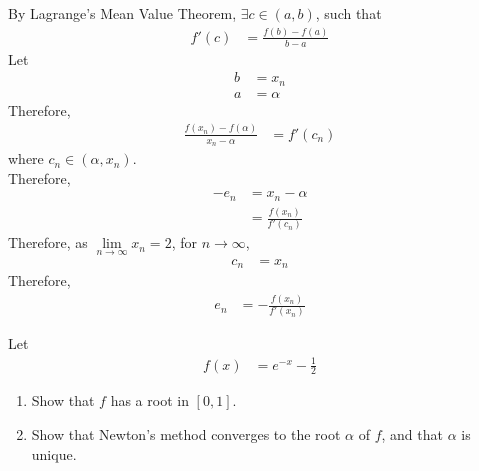 \documentclass[fleqn, a4paper, 12pt, twoside]{article}
\theoremstyle{definition}
\theoremstyle{theorem}
\begin{document}
\begin{solution}
	By Lagrange's Mean Value Theorem, $\exists c \in (a,b)$, such that
	\begin{align*}
		f'(c) & = \frac{f(b) - f(a)}{b - a}
	\end{align*}
	Let
	\begin{align*}
		b & = x_n \\
		a & = \alpha
	\end{align*}
	Therefore,
	\begin{align*}
		\frac{f(x_n) - f(\alpha)}{x_n - \alpha} & = f'(c_n)
	\end{align*}
	where $c_n \in (\alpha,x_n)$.\\
	Therefore,
	\begin{align*}
		-e_n & = x_n - \alpha \\
                     & = \frac{f(x_n)}{f'(c_n)}
	\end{align*}
	Therefore, as $\lim\limits_{n \to \infty} x_n = 2$, for $n \to \infty$,
	\begin{align*}
		c_n & = x_n
	\end{align*}
	Therefore,
	\begin{align*}
		e_n & = -\frac{f(x_n)}{f'(x_n)}
	\end{align*}
\end{solution}

\begin{question}
	Let 
	\begin{align*}
		f(x) & = e^{-x} - \frac{1}{2}
	\end{align*}
	\begin{enumerate}
		\item Show that $f$ has a root in $[0,1]$.
		\item Show that Newton's method converges to the root $\alpha$ of $f$, and that $\alpha$ is unique.
	\end{enumerate}
\end{question}
\end{document}
